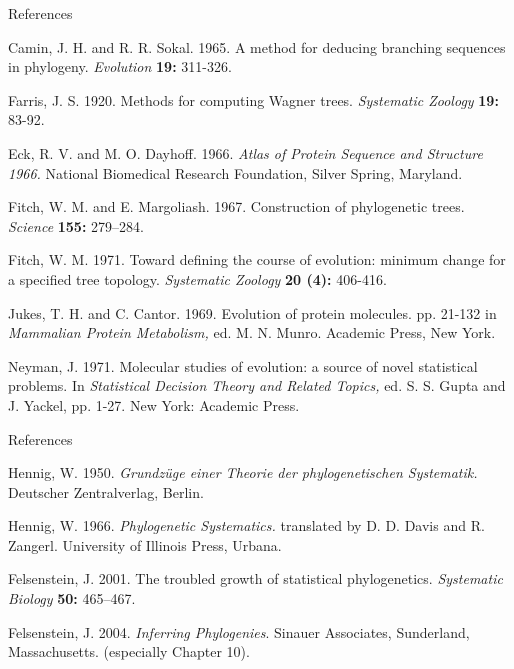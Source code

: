 \documentclass[pdf,bluish,slideColor,colorBG]{prosper}
\begin{document}
\begin{slide}[Replace]{References}

{\parindent=-0.15in

Camin, J. H. and R. R. Sokal.  1965.  A method for deducing branching sequences
in phylogeny.  {\it Evolution} {\bf 19:} 311-326.

Farris, J. S.  1920.  Methods for computing Wagner trees.  {\it Systematic
Zoology} {\bf 19:} 83-92.

Eck, R. V. and M. O. Dayhoff. 1966. {\it Atlas of
Protein Sequence and
Structure 1966.} National Biomedical Research Foundation, Silver Spring,
Maryland.

Fitch, W. M. and E. Margoliash. 1967. Construction of phylogenetic
trees.
{\it Science} {\bf 155:} 279--284.

Fitch, W. M. 1971. Toward defining the course of evolution: minimum change
for a specified tree topology. {\it Systematic Zoology} {\bf 20 (4):} 406-416.

Jukes, T. H. and C. Cantor.  1969.  Evolution of protein molecules. pp.
21-132 in {\it Mammalian Protein Metabolism,} ed. M. N. Munro. Academic Press,
New York.

Neyman, J.  1971.  Molecular studies of evolution: a source of novel
statistical problems.  In {\it Statistical Decision Theory and Related Topics,}
ed. S. S. Gupta and J. Yackel, pp. 1-27.  New York: Academic Press.

}
\end{slide}

\begin{slide}[Replace]{References}

{\parindent=-0.15in

Hennig, W. 1950. {\it Grundz\"uge einer Theorie der phylogenetischen
Systematik.} Deutscher Zentralverlag, Berlin.

Hennig, W. 1966. {\it Phylogenetic Systematics.} translated by D. D. Davis and
R. Zangerl. University of Illinois Press, Urbana.

Felsenstein, J.  2001.  The troubled growth of statistical phylogenetics.
{\it Systematic Biology} {\bf 50:} 465--467.

Felsenstein, J.  2004.  {\it Inferring Phylogenies}.  Sinauer Associates,
Sunderland, Massachusetts. (especially Chapter 10).


}
\end{slide}
\end{document}
